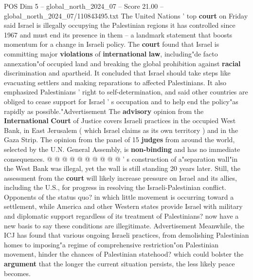 \begin{textsample}{POS Dim 5 – global\_north\_2024\_07 – Score 21.00 – global\_north\_2024\_07/110843495.txt}  \label{ex:f5_pos_301}
The United Nations ' top \textbf{court} on Friday said Israel is illegally occupying the Palestinian regions it has controlled since 1967 and must end its presence in them -- a landmark statement that boosts momentum for a change in Israeli policy.
The \textbf{court} found that Israel is committing major \textbf{violations} of \textbf{international} \textbf{law}, including"de facto annexation"of occupied land and breaking the global prohibition against \textbf{racial} discrimination and apartheid.
It concluded that Israel should take steps like evacuating settlers and making reparations to affected Palestinians.
It also emphasized Palestinians ' right to self-determination, and said other countries are obliged to cease support for Israel ' s occupation and to help end the policy"as rapidly as possible."Advertisement The \textbf{advisory} opinion from the \textbf{International} \textbf{Court} of Justice covers Israeli practices in the occupied West Bank, in East Jerusalem ( which Israel claims as its own territory ) and in the Gaza Strip.
The opinion from the panel of 15 \textbf{judges} from around the world, selected by the U.N.
General Assembly, is \textbf{non-binding} and has no immediate consequences. @ @ @ @ @ @ @ @ @ @ ' s construction of a"separation wall"in the West Bank was illegal, yet the wall is still standing 20 years later.
Still, the assessment from the \textbf{court} will likely increase pressure on Israel and its allies, including the U.S., for progress in resolving the Israeli-Palestinian conflict.
Opponents of the status quo? in which little movement is occurring toward a settlement, while America and other Western states provide Israel with military and diplomatic support regardless of its treatment of Palestinians? now have a new basis to say these conditions are illegitimate.
Advertisement Meanwhile, the ICJ has found that various ongoing Israeli practices, from demolishing Palestinian homes to imposing"a regime of comprehensive restriction"on Palestinian movement, hinder the chances of Palestinian statehood? which could bolster the \textbf{argument} that the longer the current situation persists, the less likely peace becomes.

\end{textsample}
